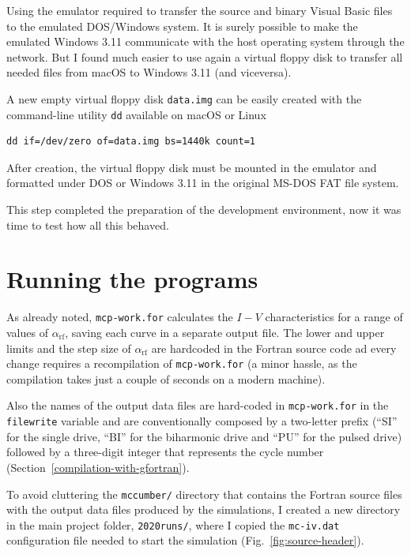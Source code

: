 Using the emulator required to transfer the source and binary Visual Basic files to the emulated DOS/Windows system.
It is surely possible to make the emulated Windows 3.11 communicate with the host operating system through the network. But I found much easier to use again a virtual floppy disk to transfer all needed files from macOS to Windows 3.11 (and viceversa).

A new empty virtual floppy disk \texttt{data.img} can be easily created with the command-line utility \texttt{dd} available on macOS or Linux

\begin{verbatim}
dd if=/dev/zero of=data.img bs=1440k count=1
\end{verbatim}


After creation, the virtual floppy disk must be mounted in the emulator and formatted under DOS or Windows 3.11 in the original MS-DOS FAT file system.

This step completed the preparation of the development environment, now it was time to test how all this behaved.



\section{Running the programs}

As already noted, \texttt{mcp-work.for} calculates the $I - V$ characteristics for a range of values of $\alpha_\mathrm{rf}$, saving each curve in a separate output file. 
The lower and upper limits and the step size of $\alpha_\mathrm{rf}$ are hardcoded in the Fortran source code ad every change requires a recompilation of \texttt{mcp-work.for} (a minor hassle, as the compilation takes just a couple of seconds on a modern machine).

Also the names of the output data files are hard-coded in \texttt{mcp-work.for} in the \texttt{filewrite} variable and are conventionally composed by a two-letter prefix (``SI'' for the single drive, ``BI'' for the biharmonic drive and ``PU'' for the pulsed drive) followed by a three-digit integer that represents the cycle number (Section~\ref{compilation-with-gfortran}).

To avoid cluttering the \texttt{mccumber/} directory that contains the Fortran source files with the output data files produced by the simulations, I created  a new directory in the main project folder, \texttt{2020runs/}, where I copied the \texttt{mc-iv.dat} configuration file needed to start the simulation (Fig.~\ref{fig:source-header}).

